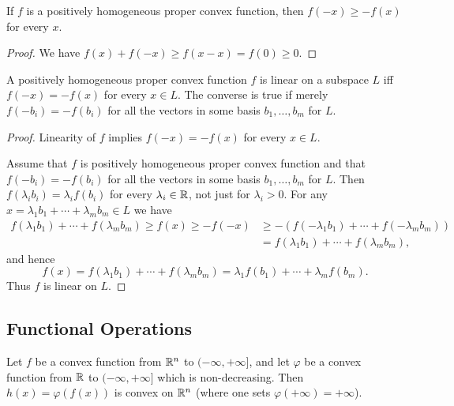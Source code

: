 \documentclass[11pt,a4paper]{article}
\begin{document}
\begin{corollary}
    If $f$ is a positively homogeneous proper convex function, then $f(-x) \ge -f(x)$ for every $x$.
\end{corollary}

\begin{proof}
    We have $f(x)+f(-x) \ge f(x-x) = f(0) \ge 0$.
\end{proof}

\begin{theorem}
    A positively homogeneous proper convex function $f$ is linear on a subspace $L$ iff $f(-x) = -f(x)$ for every $x\in L$. The converse is true if merely $f(-b_i) = -f(b_i)$ for all the vectors in some basis $b_1,\ldots,b_m$ for $L$.
\end{theorem}

\begin{proof}
    \forward Linearity of $f$ implies $f(-x)=-f(x)$ for every $x\in L$. 
    
    \noindent\converse Assume that $f$ is positively homogeneous proper convex function and that $f(-b_i) = -f(b_i)$ for all the vectors in some basis $b_1,\ldots,b_m$ for $L$. Then $f(\lambda_i b_i) = \lambda_i f(b_i)$ for every $\lambda_i \in \mathbb{R}$, not just for $\lambda_i>0$. For any $x = \lambda_1 b_1+\cdots+\lambda_m b_m\in L$ we have
    \begin{align*}
        f(\lambda_1 b_1) + \cdots + f(\lambda_m b_m) \ge f(x) \ge -f(-x) &\ge -(f(-\lambda_1 b_1) + \cdots + f(-\lambda_m b_m)) \\
        &= f(\lambda_1 b_1) + \cdots + f(\lambda_m b_m),
    \end{align*}
    and hence 
    \begin{equation*}
        f(x) = f(\lambda_1 b_1)+ \cdots + f(\lambda_m b_m) = \lambda_1 f(b_1) + \cdots + \lambda_m f(b_m).
    \end{equation*}
    Thus $f$ is linear on $L$.
\end{proof}

\subsection{Functional Operations}

\begin{theorem}\label{thm:composite_convex_function}
    Let $f$ be a convex function from $\mathbb{R}^n$ to $(-\infty,+\infty]$, and let $\varphi$ be a convex function from $\mathbb{R}$ to $(-\infty,+\infty]$ which is non-decreasing. Then $h(x) = \varphi(f(x))$ is convex on $\mathbb{R}^n$ (where one sets $\varphi(+\infty) = +\infty$).
\end{theorem}
\end{document}
